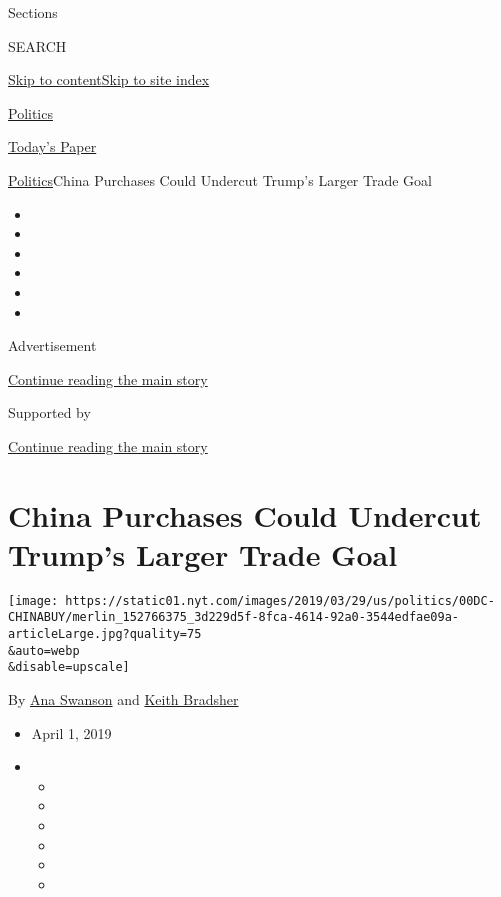 Sections

SEARCH

\protect\hyperlink{site-content}{Skip to
content}\protect\hyperlink{site-index}{Skip to site index}

\href{https://www.nytimes.com/section/politics}{Politics}

\href{https://myaccount.nytimes.com/auth/login?response_type=cookie\&client_id=vi}{}

\href{https://www.nytimes.com/section/todayspaper}{Today's Paper}

\href{/section/politics}{Politics}\textbar{}China Purchases Could
Undercut Trump's Larger Trade Goal

\begin{itemize}
\item
\item
\item
\item
\item
\item
\end{itemize}

Advertisement

\protect\hyperlink{after-top}{Continue reading the main story}

Supported by

\protect\hyperlink{after-sponsor}{Continue reading the main story}

\hypertarget{china-purchases-could-undercut-trumps-larger-trade-goal}{%
\section{China Purchases Could Undercut Trump's Larger Trade
Goal}\label{china-purchases-could-undercut-trumps-larger-trade-goal}}

\texttt{[image: https://static01.nyt.com/images/2019/03/29/us/politics/00DC-CHINABUY/merlin\_152766375\_3d229d5f-8fca-4614-92a0-3544edfae09a-articleLarge.jpg?quality=75\\\&auto=webp\\\&disable=upscale]}

By \href{https://www.nytimes.com/by/ana-swanson}{Ana Swanson} and
\href{https://www.nytimes.com/by/keith-bradsher}{Keith Bradsher}

\begin{itemize}
\item
  April 1, 2019
\item
  \begin{itemize}
  \item
  \item
  \item
  \item
  \item
  \item
  \end{itemize}
\end{itemize}


